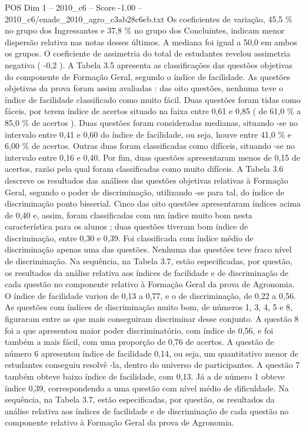 \begin{textsample}{POS Dim 1 – 2010\_c6 – Score -1.00 – 2010\_c6/enade\_2010\_agro\_c3ab28c6eb.txt}
Os coeficientes de variação, 45,5 \% no grupo dos Ingressantes e 37,8 \% no grupo dos Concluintes, indicam menor dispersão relativa nas notas desses últimos.
A mediana foi igual a 50,0 em ambos os grupos.
O coeficiente de assimetria do total de estudantes revelou assimetria negativa ( -0,2 ).
A Tabela 3.5 apresenta as classificações das questões objetivas do componente de Formação Geral, segundo o índice de facilidade.
As questões objetivas da prova foram assim avaliadas : das oito questões, nenhuma teve o índice de facilidade classificado como muito fácil.
Duas questões foram tidas como fáceis, por terem índice de acertos situado na faixa entre 0,61 e 0,85 ( de 61,0 \% a 85,0 \% de acertos ).
Duas questões foram consideradas medianas, situando -se no intervalo entre 0,41 e 0,60 do índice de facilidade, ou seja, houve entre 41,0 \% e 6,00 \% de acertos.
Outras duas foram classificadas como difíceis, situando -se no intervalo entre 0,16 e 0,40.
Por fim, duas questões apresentaram menos de 0,15 de acertos, razão pela qual foram classificadas como muito difíceis.
A Tabela 3.6 descreve os resultados das análises das questões objetivas relativas à Formação Geral, segundo o poder de discriminação, utilizando -se para tal, do índice de discriminação ponto bisserial.
Cinco das oito questões apresentaram índices acima de 0,40 e, assim, foram classificadas com um índice muito bom nesta característica para os alunos ; duas questões tiveram bom índice de discriminação, entre 0,30 e 0,39.
Foi classificada com índice médio de discriminação apenas uma das questões.
Nenhuma das questões teve fraco nível de discriminação.
Na sequência, na Tabela 3.7, estão especificadas, por questão, os resultados da análise relativa aos índices de facilidade e de discriminação de cada questão no componente relativo à Formação Geral da prova de Agronomia.
O índice de facilidade variou de 0,13 a 0,77, e o de discriminação, de 0,22 a 0,56.
As questões com índices de discriminação muito bom, de números 1, 3, 4, 5 e 8, figuraram entre as que mais conseguiram discriminar desse conjunto.
A questão 8 foi a que apresentou maior poder discriminatório, com índice de 0,56, e foi também a mais fácil, com uma proporção de 0,76 de acertos.
A questão de número 6 apresentou índice de facilidade 0,14, ou seja, um quantitativo menor de estudantes conseguiu resolvê -la, dentro do universo de participantes.
A questão 7 também obteve baixo índice de facilidade, com 0,13.
Já a de número 1 obteve índice 0,39, correspondendo a uma questão com nível médio de dificuldade.
Na sequência, na Tabela 3.7, estão especificadas, por questão, os resultados da análise relativa aos índices de facilidade e de discriminação de cada questão no componente relativo à Formação Geral da prova de Agronomia.

\end{textsample}
